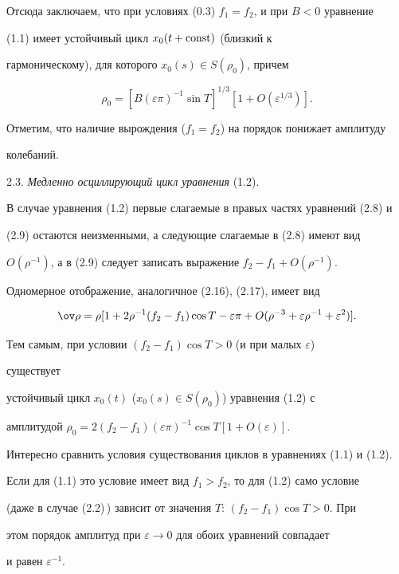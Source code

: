 Отсюда заключаем, что при условиях (0.3) $f_1=f_2$, и при $B<0$ уравнение


(1.1) имеет устойчивый цикл $x_0(t+\operatorname{const})$ (близкий к


гармоническому), для которого $x_0(s)\in S(\rho_0)$, причем


$$


\rho_0=[B(\varepsilon\pi)^{-1}\sin T]^{1/3}[1+O(\varepsilon^{1/3})].


$$


Отметим, что наличие вырождения ($f_1=f_2$) на порядок понижает амплитуду


колебаний.


\medskip





2.3. {\it Медленно осциллирующий цикл уравнения} (1.2).


В случае уравнения (1.2) первые слагаемые в правых частях уравнений (2.8) и


(2.9) остаются неизменными, а следующие слагаемые в (2.8) имеют вид


$O(\rho^{-1})$, а в (2.9) следует записать выражение $f_2-f_1+O(\rho^{-1})$.


Одномерное отображение, аналогичное (2.16), (2.17), имеет вид


$$


\ov\rho=\rho[1+2\rho^{-1}(f_2-f_1)\cos T-\varepsilon\pi+


O(\rho^{-3}+\varepsilon\rho^{-1}+\varepsilon^2)].


$$


Тем самым, при условии $(f_2-f_1)\cos T>0$ (и при малых $\varepsilon$)


существует


устойчивый цикл $x_0(t)$ ($x_0(s)\in S(\rho_0)$) уравнения (1.2) с


амплитудой $\rho_0=2(f_2-f_1)(\varepsilon\pi)^{-1}\cos T[1+O(\varepsilon)]$.





Интересно сравнить условия существования циклов в уравнениях (1.1) и (1.2).


Если для (1.1) это условие имеет вид $f_1>f_2$, то для (1.2) само условие


(даже в случае (2.2)\,) зависит от значения $T$: $(f_2-f_1)\cos T>0$. При


этом порядок амплитуд при $\varepsilon\to 0$ для обоих уравнений совпадает


и равен $\varepsilon^{-1}$.





